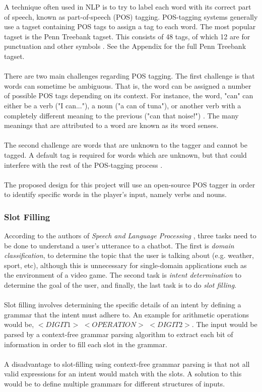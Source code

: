 \documentclass[12pt]{article}
\begin{document}
A technique often used in NLP is to try to label each word with its correct part of speech, known as part-of-speech (POS) tagging. POS-tagging systems generally use a tagset containing POS tags to assign a tag to each word. The most popular tagset is the Penn Treebank tagset. This consists of 48 tags, of which 12 are for punctuation and other symbols \cite{RefWorks:41}. See the Appendix for the full Penn Treebank tagset.
\\
\\
There are two main challenges regarding POS tagging. The first challenge is that words can sometime be ambiguous. That is, the word can be assigned a number of possible POS tags depending on its context. For instance, the word, "can" can either be a verb ("I can..."), a noun ("a can of tuna"), or another verb with a completely different meaning to the previous ("can that noise!") \cite{RefWorks:43}. The many meanings that are attributed to a word are known as its word senses.
\\
\\
The second challenge are words that are unknown to the tagger and cannot be tagged. A default tag is required for words which are unknown, but that could interfere with the rest of the POS-tagging process \cite{RefWorks:41}.
\\
\\
The proposed design for this project will use an open-source POS tagger in order to identify specific words in the player's input, namely verbs and nouns.

\subsubsection{Slot Filling}

According to the authors of \textit{Speech and Language Processing} \cite{RefWorks:107}, three tasks need to be done to understand a user's utterance to a chatbot. The first is \textit{domain classification}, to determine the topic that the user is talking about (e.g. weather, sport, etc), although this is unnecessary for single-domain applications such as the environment of a video game. The second task is \textit{intent determination} to determine the goal of the user, and finally, the last task is to do \textit{slot filling}.
\\
\\
Slot filling involves determining the specific details of an intent by defining a grammar that the intent must adhere to. An example for arithmetic operations would be, $<DIGIT1>$ $<OPERATION>$ $<DIGIT2>$. The input would be parsed by a context-free grammar parsing algorithm to extract each bit of information in order to fill each slot in the grammar.
\\
\\
A disadvantage to slot-filling using context-free grammar parsing is that not all valid expressions for an intent would match with the slots. A solution to this would be to define multiple grammars for different structures of inputs.
\end{document}
